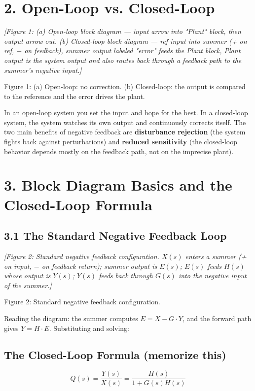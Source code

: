\documentclass[11pt]{article}
\begin{document}
\section*{2. Open-Loop vs. Closed-Loop}

\textit{[Figure 1: (a) Open-loop block diagram — input arrow into "Plant" block, then output arrow out. (b) Closed-loop block diagram — ref input into summer (+ on ref, $-$ on feedback), summer output labeled "error" feeds the Plant block, Plant output is the system output and also routes back through a feedback path to the summer's negative input.]}

Figure 1: (a) Open-loop: no correction. (b) Closed-loop: the output is compared to the reference and the error drives the plant.

In an open-loop system you set the input and hope for the best. In a closed-loop system, the system watches its own output and continuously corrects itself. The two main benefits of negative feedback are \textbf{disturbance rejection} (the system fights back against perturbations) and \textbf{reduced sensitivity} (the closed-loop behavior depends mostly on the feedback path, not on the imprecise plant).

\section*{3. Block Diagram Basics and the Closed-Loop Formula}

\subsection*{3.1 The Standard Negative Feedback Loop}

\textit{[Figure 2: Standard negative feedback configuration. $X(s)$ enters a summer (+ on input, $-$ on feedback return); summer output is $E(s)$; $E(s)$ feeds $H(s)$ whose output is $Y(s)$; $Y(s)$ feeds back through $G(s)$ into the negative input of the summer.]}

Figure 2: Standard negative feedback configuration.

Reading the diagram: the summer computes $E = X - G \cdot Y$, and the forward path gives $Y = H \cdot E$. Substituting and solving:

\subsection*{The Closed-Loop Formula (memorize this)}

\[Q(s) = \frac{Y(s)}{X(s)} = \frac{H(s)}{1 + G(s)H(s)}\]
\end{document}
